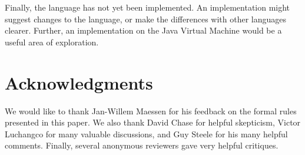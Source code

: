 \documentclass[nocopyrightspace,10pt]{acm-sigplan}
\begin{document}
Finally, the language has not yet been implemented.  An implementation
might suggest changes to the language, or make the differences with
other languages clearer.  Further, an implementation on the Java
Virtual Machine would be a useful area of exploration.

\section*{Acknowledgments}

We would like to thank Jan-Willem Maessen for his 
feedback on the formal rules presented in this paper.  We also thank
David Chase for helpful skepticism, Victor
Luchangco for many valuable discussions, and Guy Steele for his many
helpful comments.  Finally, several anonymous reviewers gave very
helpful critiques.  




\end{document}
